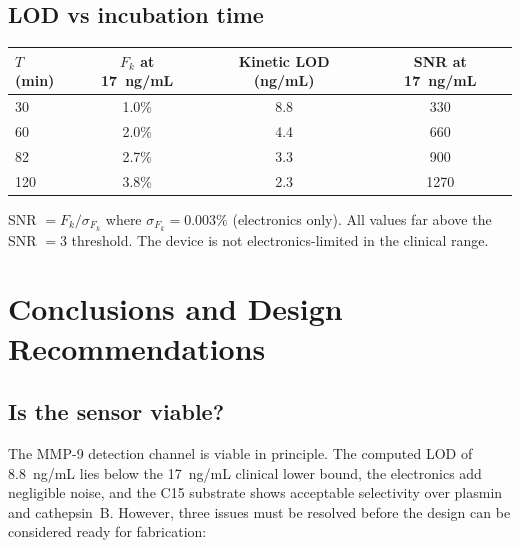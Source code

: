 \documentclass[10pt,a4paper]{article}
\begin{document}
\subsection{LOD vs incubation time}

\begin{center}
\begin{tabular}{lccc}
\toprule
$T$ (min) & $F_k$ at 17~ng/mL & Kinetic LOD (ng/mL) & SNR at 17~ng/mL \\
\midrule
30  & 1.0\%  & 8.8 & 330 \\
60  & 2.0\%  & 4.4 & 660 \\
82  & 2.7\%  & 3.3 & 900 \\
120 & 3.8\%  & 2.3 & 1270 \\
\bottomrule
\end{tabular}
\end{center}

SNR $= F_k / \sigma_{F_k}$ where $\sigma_{F_k} = 0.003\%$ (electronics only). All values far
above the SNR $= 3$ threshold. The device is not electronics-limited in the clinical range.

\section{Conclusions and Design Recommendations}

\subsection{Is the sensor viable?}

The MMP-9 detection channel is viable in principle. The computed LOD of 8.8~ng/mL lies below
the 17~ng/mL clinical lower bound, the electronics add negligible noise, and the C15 substrate
shows acceptable selectivity over plasmin and cathepsin~B. However, three issues must be
resolved before the design can be considered ready for fabrication:
\end{document}
